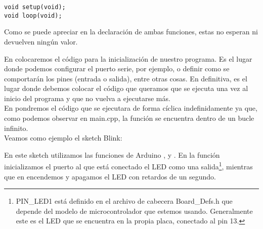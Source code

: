 \begin{lstlisting}[caption=Sección de wiring.h]
void setup(void);
void loop(void);
\end{lstlisting}

Como se puede apreciar en la declaración de ambas funciones, estas no esperan ni devuelven ningún valor.


En  colocaremos el código para la inicialización de nuestro programa. Es el lugar donde podemos configurar el puerto serie, por ejemplo, o definir como se comportarán los pines (entrada o salida), entre otras cosas. En definitiva, es el lugar donde debemos colocar el código que queramos que se ejecuta una vez al inicio del programa y que no vuelva a ejecutarse más.\\
En  pondremos el código que se ejecutara de forma cíclica indefinidamente ya que, como podemos observar en main.cpp, la función  se encuentra dentro de un bucle infinito.\\

Veamos como ejemplo el sketch Blink:


En este sketch utilizamos las funciones de Arduino , y . En la función  inicializamos el puerto al que está conectado el LED como una salida\protect\footnote{PIN\_LED1 está definido en el archivo de cabecera Board\_Defs.h que depende del modelo de microcontrolador que estemos usando. Generalmente este es el LED que se encuentra en la propia placa, conectado al pin 13.}, mientras que en  encendemos y apagamos el LED con retardos de un segundo.

